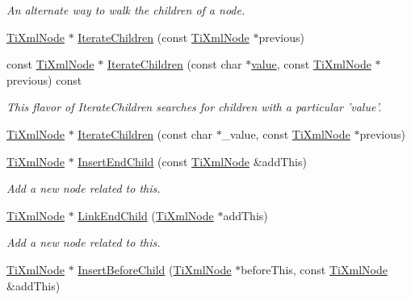\begin{DoxyCompactItemize}
\begin{DoxyCompactList}\small\item\em An alternate way to walk the children of a node. \item\end{DoxyCompactList}\item 
\hyperlink{classTiXmlNode}{TiXmlNode} $\ast$ \hyperlink{classTiXmlNode_a2358e747118fdbf0e467b1e4f7d03de1}{IterateChildren} (const \hyperlink{classTiXmlNode}{TiXmlNode} $\ast$previous)
\item 
const \hyperlink{classTiXmlNode}{TiXmlNode} $\ast$ \hyperlink{classTiXmlNode_af2b86dbe25d3d26fa48180edc5e2a9fc}{IterateChildren} (const char $\ast$\hyperlink{classTiXmlNode_aead528b3cedc33c16a6c539872c7cc8b}{value}, const \hyperlink{classTiXmlNode}{TiXmlNode} $\ast$previous) const 
\begin{DoxyCompactList}\small\item\em This flavor of IterateChildren searches for children with a particular 'value'. \item\end{DoxyCompactList}\item 
\hyperlink{classTiXmlNode}{TiXmlNode} $\ast$ \hyperlink{classTiXmlNode_a67ba8275e533e6f76340236c42ea0aea}{IterateChildren} (const char $\ast$\_\-value, const \hyperlink{classTiXmlNode}{TiXmlNode} $\ast$previous)
\item 
\hyperlink{classTiXmlNode}{TiXmlNode} $\ast$ \hyperlink{classTiXmlNode_af287a913ce46d8dbf7ef24fec69bbaf0}{InsertEndChild} (const \hyperlink{classTiXmlNode}{TiXmlNode} \&addThis)
\begin{DoxyCompactList}\small\item\em Add a new node related to this. \item\end{DoxyCompactList}\item 
\hyperlink{classTiXmlNode}{TiXmlNode} $\ast$ \hyperlink{classTiXmlNode_a1a881212554b759865f6cac79a851d38}{LinkEndChild} (\hyperlink{classTiXmlNode}{TiXmlNode} $\ast$addThis)
\begin{DoxyCompactList}\small\item\em Add a new node related to this. \item\end{DoxyCompactList}\item 
\hyperlink{classTiXmlNode}{TiXmlNode} $\ast$ \hyperlink{classTiXmlNode_a71e54e393336382bc9875f64aab5cb15}{InsertBeforeChild} (\hyperlink{classTiXmlNode}{TiXmlNode} $\ast$beforeThis, const \hyperlink{classTiXmlNode}{TiXmlNode} \&addThis)

\end{DoxyCompactItemize}
